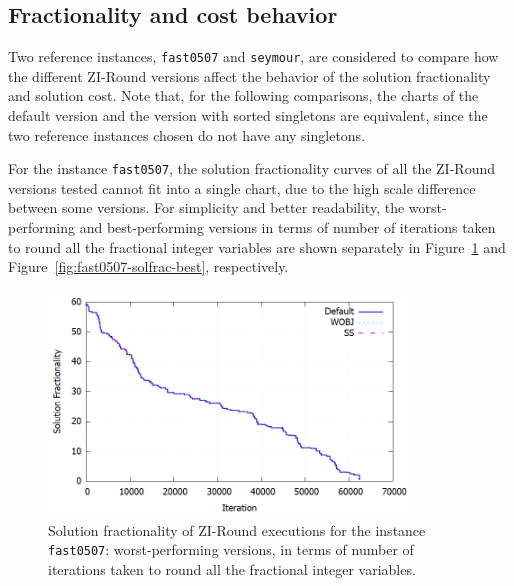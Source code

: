 \documentclass[a4paper,12pt,twoside]{scrbook}
\begin{document}
\subsection{Fractionality and cost behavior}

Two reference instances, \texttt{fast0507} and \texttt{seymour}, are considered to compare how the different ZI-Round versions affect the behavior of the solution fractionality and solution cost. Note that, for the following comparisons, the charts of the default version and the version with sorted singletons are equivalent, since the two reference instances chosen do not have any singletons. \par

For the instance \texttt{fast0507}, the solution fractionality curves of all the ZI-Round versions tested cannot fit into a single chart, due to the high scale difference between some versions. For simplicity and better readability, the worst-performing and best-performing versions in terms of number of iterations taken to round all the fractional integer variables are shown separately in Figure~\ref{fig:fast0507-solfrac-worst} and Figure~\ref{fig:fast0507-solfrac-best}, respectively.

\begin{figure}[ht]
	\centering
	\includegraphics[width=0.85\textwidth]{fast0507-solfrac-worst.png}
	\caption{Solution fractionality of ZI-Round executions for the instance \texttt{fast0507}: worst-performing versions, in terms of number of iterations taken to round all the fractional integer variables.}
	\label{fig:fast0507-solfrac-worst}
\end{figure}
\end{document}
